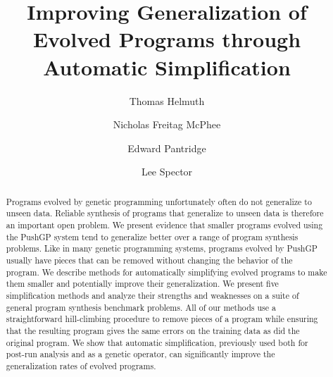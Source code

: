 \documentclass[sigconf]{acmart}
\begin{document}
\title{Improving Generalization of Evolved Programs through Automatic Simplification}


\author{Thomas Helmuth}

\author{Nicholas Freitag McPhee}

\author{Edward Pantridge}

\author{Lee Spector}



\begin{abstract}
Programs evolved by genetic programming unfortunately often do not generalize to unseen data. Reliable synthesis of programs that generalize to unseen data is therefore an important open problem. We present evidence that smaller programs evolved using the PushGP system tend to generalize better over a range of program synthesis problems. Like in many genetic programming systems, programs evolved by PushGP usually have pieces that can be removed without changing the behavior of the program. We describe methods for automatically simplifying evolved programs to make them smaller and potentially improve their generalization. We present five simplification methods and analyze their strengths and weaknesses on a suite of general program synthesis benchmark problems. All of our methods use a straightforward hill-climbing procedure to remove pieces of a program while ensuring that the resulting program gives the same errors on the training data as did the original program. We show that automatic simplification, previously used both for post-run analysis and as a genetic operator, can significantly improve the generalization rates of evolved programs.
\end{abstract}
\end{document}
